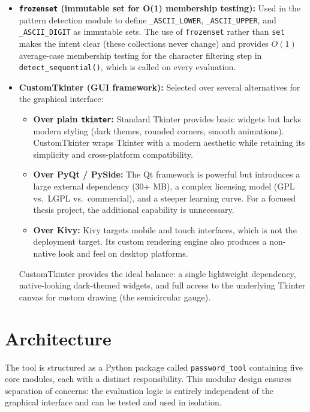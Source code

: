 \begin{itemize}
    \item \textbf{\texttt{frozenset} (immutable set for O(1) membership testing):} Used in the pattern detection module to define \texttt{\_ASCII\_LOWER}, \texttt{\_ASCII\_UPPER}, and \texttt{\_ASCII\_DIGIT} as immutable sets. The use of \texttt{frozenset} rather than \texttt{set} makes the intent clear (these collections never change) and provides $O(1)$ average-case membership testing for the character filtering step in \texttt{detect\_sequential()}, which is called on every evaluation.

    \item \textbf{CustomTkinter (GUI framework):} Selected over several alternatives for the graphical interface:
    \begin{itemize}
        \item \textbf{Over plain \texttt{tkinter}:} Standard Tkinter provides basic widgets but lacks modern styling (dark themes, rounded corners, smooth animations). CustomTkinter wraps Tkinter with a modern aesthetic while retaining its simplicity and cross-platform compatibility.
        \item \textbf{Over PyQt / PySide:} The Qt framework is powerful but introduces a large external dependency (30+ MB), a complex licensing model (GPL vs.\ LGPL vs.\ commercial), and a steeper learning curve. For a focused thesis project, the additional capability is unnecessary.
        \item \textbf{Over Kivy:} Kivy targets mobile and touch interfaces, which is not the deployment target. Its custom rendering engine also produces a non-native look and feel on desktop platforms.
    \end{itemize}
    CustomTkinter provides the ideal balance: a single lightweight dependency, native-looking dark-themed widgets, and full access to the underlying Tkinter canvas for custom drawing (the semicircular gauge).
\end{itemize}


\section{Architecture}

The tool is structured as a Python package called \texttt{password\_tool} containing five core modules, each with a distinct responsibility. This modular design ensures separation of concerns: the evaluation logic is entirely independent of the graphical interface and can be tested and used in isolation.

